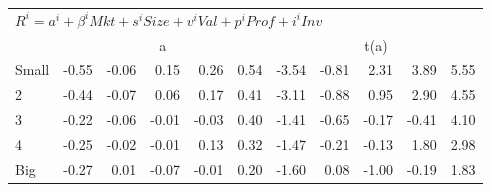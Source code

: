 \begin{table}[!ht]
\begin{tabular}{lrrrrrrrrrr}
  \midrule
  \multicolumn{11}{l}{$R^i=a^i+\beta^iMkt+s^iSize+v^iVal+p^iProf+i^iInv$}  \\
  
     & \multicolumn{5}{c}{a} & \multicolumn{5}{c}{t(a)}   \\
     \cmidrule(r){2-6} \cmidrule(r){7-11} 
    Small  & -0.55  & -0.06  & 0.15  & 0.26  & 0.54  & -3.54  & -0.81  & 2.31  & 3.89  & 5.55   \\
    2  & -0.44  & -0.07  & 0.06  & 0.17  & 0.41  & -3.11  & -0.88  & 0.95  & 2.90  & 4.55   \\
    3  & -0.22  & -0.06  & -0.01  & -0.03  & 0.40  & -1.41  & -0.65  & -0.17  & -0.41  & 4.10   \\
    4  & -0.25  & -0.02  & -0.01  & 0.13  & 0.32  & -1.47  & -0.21  & -0.13  & 1.80  & 2.98   \\
    Big  & -0.27  & 0.01  & -0.07  & -0.01  & 0.20  & -1.60  & 0.08  & -1.00  & -0.19  & 1.83   \\

  \bottomrule
\end{tabular}
\label{tbl:Size_Prior}
\end{table}